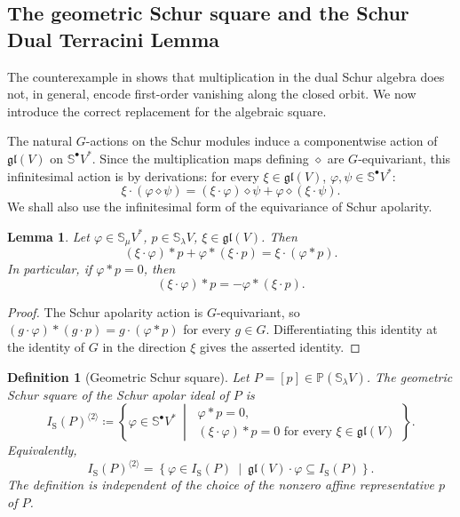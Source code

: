 \documentclass[a4paper,reqno]{amsart}
\theoremstyle{plainnopunct}
\newtheorem{lemma}[lemma]{Lemma}
\theoremstyle{definitionnopunct}
\newtheorem{definition}[definition]{Definition}
\renewcommand{\P}{\mathbb{P}}
\renewcommand{\S}{\mathbb{S}}
\newcommand{\Lie}{\mathfrak}
\begin{document}
\subsection{The geometric Schur square and the Schur Dual Terracini Lemma}
\label{subsect: geometric Schur square}

The counterexample in  shows that multiplication in the dual Schur algebra does not, in general, encode first-order vanishing along the closed orbit. We now introduce the correct replacement for the algebraic square.

The natural $G$-actions on the Schur modules induce a componentwise action of $\Lie{gl}(V)$ on $\S^\bullet V^*$. Since the multiplication maps defining $\diamond$ are $G$-equivariant, this infinitesimal action is by derivations: for every $\xi\in\Lie{gl}(V)$, $\varphi,\psi\in\S^\bullet V^*$:
\[\xi\cdot(\varphi\diamond\psi)
=
(\xi\cdot\varphi)\diamond\psi
+
\varphi\diamond(\xi\cdot\psi).
\]
We shall also use the infinitesimal form of the equivariance of Schur apolarity.

\begin{lemma}
\label{lem: infinitesimal equivariance Schur apolarity}
Let $\varphi\in\S_\mu V^*$, $p\in\S_\lambda V$, $\xi\in\Lie{gl}(V)$. Then
\[(\xi\cdot\varphi)*p
+
\varphi*(\xi\cdot p)
=
\xi\cdot(\varphi*p).
\]In particular, if $\varphi*p=0$, then
\[
(\xi\cdot\varphi)*p
=
-
\varphi*(\xi\cdot p).
\]\end{lemma}

\begin{proof}
The Schur apolarity action is $G$-equivariant, so $(g\cdot\varphi)*(g\cdot p)
=
g\cdot(\varphi*p)$ for every $g\in G$. Differentiating this identity at the identity of $G$ in the direction $\xi$ gives the asserted identity.
\end{proof}

\begin{definition}[Geometric Schur square]
\label{def: geometric Schur square}
Let $P=[p]\in\P(\S_\lambda V)$. The \emph{geometric Schur square} of the Schur apolar ideal of $P$ is
\[I_{\mathrm S}(P)^{\langle2\rangle}
\coloneq
\left\{
\varphi\in\S^\bullet V^*
\ \middle|\
\begin{array}{l}
\varphi*p=0,\\[2pt]
(\xi\cdot\varphi)*p=0
\text{ for every }\xi\in\Lie{gl}(V)
\end{array}
\right\}.
\]Equivalently,
\[I_{\mathrm S}(P)^{\langle2\rangle}
=
\left\{
\varphi\in I_{\mathrm S}(P)
\ \middle|\
\Lie{gl}(V)\cdot\varphi
\subseteq
I_{\mathrm S}(P)
\right\}.
\]
The definition is independent of the choice of the nonzero affine representative $p$ of $P$.
\end{definition}
\end{document}
